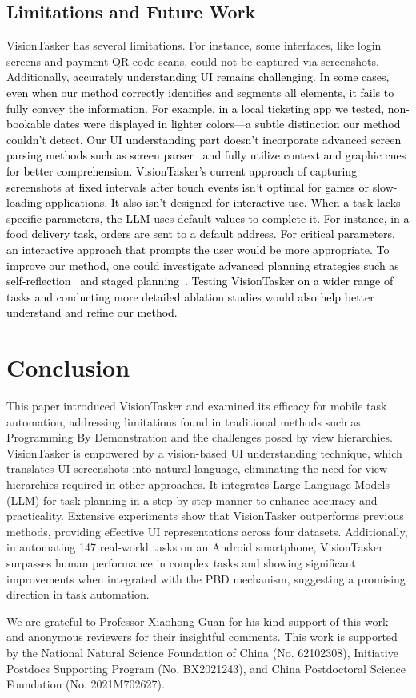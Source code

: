 \subsection{Limitations and Future Work}
VisionTasker has several limitations. For instance, some interfaces, like login screens and payment QR code scans, could not be captured via screenshots. Additionally, \textcolor{black}{accurately understanding UI remains challenging. In some cases, even when our method correctly identifies and segments all elements, it fails to fully convey the information. For example, in a local ticketing app we tested, non-bookable dates were displayed in lighter colors—a subtle distinction our method couldn't detect. Our UI understanding part doesn't incorporate advanced screen parsing methods such as screen parser~\cite{wu2021screen} and fully utilize context and graphic cues for better comprehension. VisionTasker's current approach of capturing screenshots at fixed intervals after touch events isn't optimal for games or slow-loading applications. It also isn't designed for interactive use. When a task lacks specific parameters, the LLM uses default values to complete it. For instance, in a food delivery task, orders are sent to a default address. For critical parameters, an interactive approach that prompts the user would be more appropriate. To improve our method, one could investigate advanced planning strategies such as self-reflection~\cite{shinn2024reflexion} and staged planning~\cite{li2023zero}. Testing VisionTasker on a wider range of tasks and conducting more detailed ablation studies would also help better understand and refine our method.}

\section{Conclusion}

This paper introduced VisionTasker and examined its efficacy for mobile task automation, addressing limitations found in traditional methods such as Programming By Demonstration and the challenges posed by view hierarchies. VisionTasker is empowered by a vision-based UI understanding technique, which translates UI screenshots into natural language, eliminating the need for view hierarchies required in other approaches. It integrates Large Language Models (LLM) for task planning in a step-by-step manner to enhance accuracy and practicality. Extensive experiments show that VisionTasker outperforms previous methods, providing effective UI representations across four datasets. Additionally, in automating 147 real-world tasks on an Android smartphone, VisionTasker surpasses human performance in complex tasks and showing significant improvements when integrated with the PBD mechanism, suggesting a promising direction in task automation.

\begin{acks}
We are grateful to Professor Xiaohong Guan for his kind support of this work and anonymous reviewers for their insightful comments. This work is supported by the National Natural Science Foundation of China (No. 62102308), Initiative Postdocs Supporting Program (No. BX2021243), and China Postdoctoral Science Foundation (No. 2021M702627).
\end{acks}

